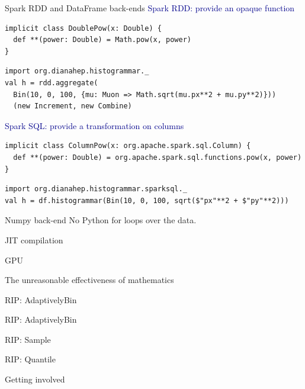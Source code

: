 \documentclass[aspectratio=169]{beamer}
\begin{document}
\begin{frame}[fragile]{Spark RDD and DataFrame back-ends}
\vspace{0.5 cm}
\textcolor{darkblue}{\large Spark RDD: provide an opaque function}

\begin{lstlisting}[basicstyle=\ttfamily\scriptsize\color{gray}]
implicit class DoublePow(x: Double) {
  def **(power: Double) = Math.pow(x, power)
}
\end{lstlisting}

\vspace{-0.25 cm}
\small
\begin{verbatim}
import org.dianahep.histogrammar._
val h = rdd.aggregate(
  Bin(10, 0, 100, {mu: Muon => Math.sqrt(mu.px**2 + mu.py**2)}))
  (new Increment, new Combine)
\end{verbatim}

\vspace{0.5 cm}
\textcolor{darkblue}{\large Spark SQL: provide a transformation on columns}

\begin{lstlisting}[basicstyle=\ttfamily\scriptsize\color{gray}]
implicit class ColumnPow(x: org.apache.spark.sql.Column) {
  def **(power: Double) = org.apache.spark.sql.functions.pow(x, power)
}
\end{lstlisting}

\vspace{-0.25 cm}
\small
\begin{verbatim}
import org.dianahep.histogrammar.sparksql._
val h = df.histogrammar(Bin(10, 0, 100, sqrt($"px"**2 + $"py"**2)))
\end{verbatim}
\end{frame}

\begin{frame}{Numpy back-end}
No Python for loops over the data.
\end{frame}

\begin{frame}{JIT compilation}
\end{frame}

\begin{frame}{GPU}
\end{frame}

\begin{frame}{The unreasonable effectiveness of mathematics}
\end{frame}

\begin{frame}{RIP: AdaptivelyBin}
\end{frame}

\begin{frame}{RIP: AdaptivelyBin}
\end{frame}

\begin{frame}{RIP: Sample}
\end{frame}

\begin{frame}{RIP: Quantile}
\end{frame}

\begin{frame}{Getting involved}
\end{frame}
\end{document}

